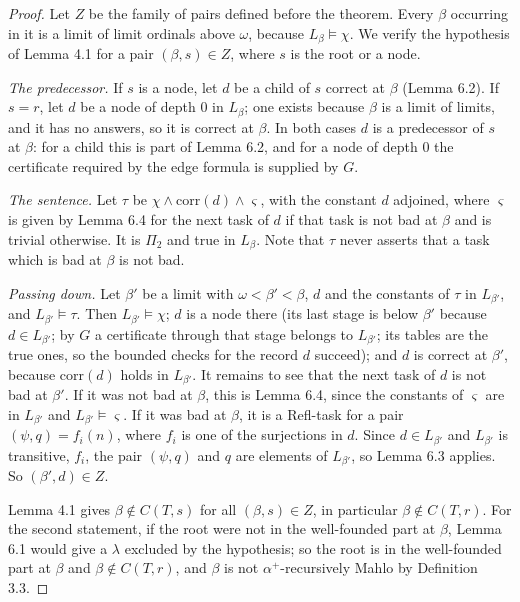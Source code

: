 \documentclass[11pt]{article}
\begin{document}
\begin{proof}
Let $Z$ be the family of pairs defined before the theorem. Every $\beta$ occurring in it is a
limit of limit ordinals above $\omega$, because $L_{\beta} \models \chi$. We verify the hypothesis of Lemma 4.1 for a
pair $(\beta, s) \in Z$, where $s$ is the root or a node.

\emph{The predecessor.} If $s$ is a node, let $d$ be a child of $s$ correct at $\beta$ (Lemma 6.2). If $s = r$, let
$d$ be a node of depth 0 in $L_{\beta}$; one exists because $\beta$ is a limit of limits, and it has no answers,
so it is correct at $\beta$. In both cases $d$ is a predecessor of $s$ at $\beta$: for a child this is part of Lemma
6.2, and for a node of depth 0 the certificate required by the edge formula is supplied by $G$.

\emph{The sentence.} Let $\tau$ be $\chi \wedge \mathrm{corr}(d) \wedge \varsigma$, with the constant $d$ adjoined,
where $\varsigma$ is given by Lemma 6.4 for the next task of $d$ if that task is not bad at $\beta$ and is trivial
otherwise. It is $\Pi_2$ and true in $L_{\beta}$. Note that $\tau$ never asserts that a task which is bad at $\beta$ is
not bad.

\emph{Passing down.} Let $\beta'$ be a limit with $\omega < \beta' < \beta$, $d$ and the constants of $\tau$ in $L_{\beta'}$, and
$L_{\beta'} \models \tau$. Then $L_{\beta'} \models \chi$; $d$ is a node there (its last stage is below $\beta'$ because
$d \in L_{\beta'}$; by $G$ a certificate through that stage belongs to $L_{\beta'}$; its tables are the true ones, so the
bounded checks for the record $d$ succeed); and $d$ is correct at $\beta'$, because $\mathrm{corr}(d)$ holds in
$L_{\beta'}$. It remains to see that the next task of $d$ is not bad at $\beta'$. If it was not bad at $\beta$, this
is Lemma 6.4, since the constants of $\varsigma$ are in $L_{\beta'}$ and $L_{\beta'} \models \varsigma$. If it was bad at
$\beta$, it is a Refl-task for a pair $(\psi, q) = f_i(n)$, where $f_i$ is one of the surjections in $d$. Since
$d \in L_{\beta'}$ and $L_{\beta'}$ is transitive, $f_i$, the pair $(\psi, q)$ and $q$ are elements of $L_{\beta'}$, so
Lemma 6.3 applies. So $(\beta', d) \in Z$.

Lemma 4.1 gives $\beta \notin C(T, s)$ for all $(\beta, s) \in Z$, in particular $\beta \notin C(T, r)$. For the
second statement, if the root were not in the well-founded part at $\beta$, Lemma 6.1 would give a $\lambda$ excluded
by the hypothesis; so the root is in the well-founded part at $\beta$ and $\beta \notin C(T, r)$, and $\beta$ is not
$\alpha^+$-recursively Mahlo by Definition 3.3.
\end{proof}
\end{document}
